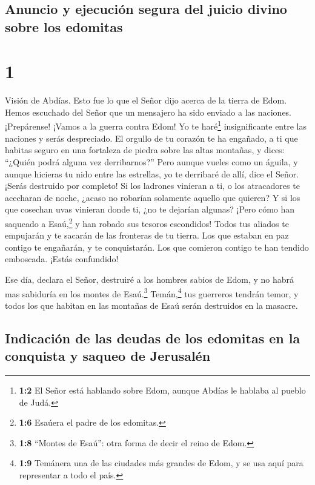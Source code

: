 \hypertarget{anuncio-y-ejecuciuxf3n-segura-del-juicio-divino-sobre-los-edomitas}{%
\subsection{Anuncio y ejecución segura del juicio divino sobre los
edomitas}\label{anuncio-y-ejecuciuxf3n-segura-del-juicio-divino-sobre-los-edomitas}}

\hypertarget{section}{%
\section{1}\label{section}}

 Visión de Abdías. Esto fue lo que el Señor dijo acerca de
la tierra de Edom. Hemos escuchado del Señor que un mensajero ha sido
enviado a las naciones. ¡Prepárense! ¡Vamos a la guerra contra Edom!
 Yo te haré\footnote{\textbf{1:2} El Señor está hablando
  sobre Edom, aunque Abdías le hablaba al pueblo de Judá.}
insignificante entre las naciones y serás despreciado.  El
orgullo de tu corazón te ha engañado, a ti que habitas seguro en una
fortaleza de piedra sobre las altas montañas, y dices: ``¿Quién podrá
alguna vez derribarnos?''  Pero aunque vueles como un
águila, y aunque hicieras tu nido entre las estrellas, yo te derribaré
de allí, dice el Señor.  ¡Serás destruido por completo! Si
los ladrones vinieran a ti, o los atracadores te acecharan de noche,
¿acaso no robarían solamente aquello que quieren? Y si los que cosechan
uvas vinieran donde ti, ¿no te dejarían algunas?  ¡Pero
cómo han saqueado a Esaú,\footnote{\textbf{1:6} Esaúera el padre de los
  edomitas.} y han robado sus tesoros escondidos!  Todos
tus aliados te empujarán y te sacarán de las fronteras de tu tierra. Los
que estaban en paz contigo te engañarán, y te conquistarán. Los que
comieron contigo te han tendido emboscada. ¡Estás confundido!

 Ese día, declara el Señor, destruiré a los hombres sabios
de Edom, y no habrá mas sabiduría en los montes de Esaú.\footnote{\textbf{1:8}
  ``Montes de Esaú'': otra forma de decir el reino de Edom.}
 Temán,\footnote{\textbf{1:9} Temánera una de las ciudades
  más grandes de Edom, y se usa aquí para representar a todo el país.}
tus guerreros tendrán temor, y todos los que habitan en las montañas de
Esaú serán destruidos en la masacre.

\hypertarget{indicaciuxf3n-de-las-deudas-de-los-edomitas-en-la-conquista-y-saqueo-de-jerusaluxe9n}{%
\subsection{Indicación de las deudas de los edomitas en la conquista y
saqueo de
Jerusalén}\label{indicaciuxf3n-de-las-deudas-de-los-edomitas-en-la-conquista-y-saqueo-de-jerusaluxe9n}}

